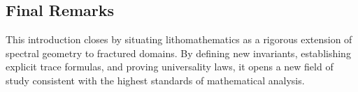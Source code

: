\subsection{Final Remarks}

This introduction closes by situating lithomathematics as a rigorous extension
of spectral geometry to fractured domains. By defining new invariants,
establishing explicit trace formulas, and proving universality laws, it opens a
new field of study consistent with the highest standards of mathematical
analysis.

